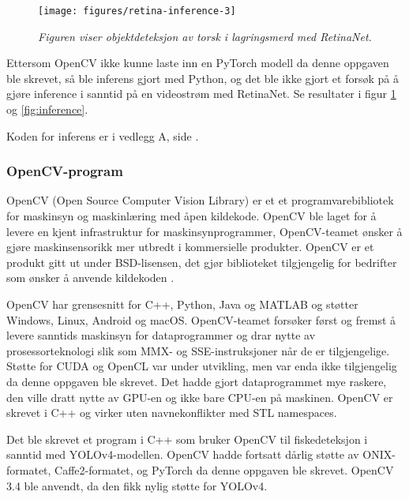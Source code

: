 \begin{figure}
\begin{center} 
\texttt{[image: figures/retina-inference-3]}
\caption{\small \sl Figuren viser objektdeteksjon av torsk i lagringsmerd med RetinaNet. \label{fig:retinenet_inference}} 
\end{center} 
\end{figure} 

Ettersom OpenCV ikke kunne laste inn en PyTorch modell da denne oppgaven ble skrevet, så ble inferens gjort med Python, og det ble ikke gjort et forsøk på å gjøre inference i sanntid på en videostrøm med RetinaNet. Se resultater i figur \ref{fig:retinenet_inference} og \ref{fig:inference}.

Koden for inferens er i vedlegg A, side \pageref{lst:inferens_retinanet}.

\subsubsection{OpenCV-program} \label{part:opencv}

OpenCV (Open Source Computer Vision Library) er et et programvarebibliotek for maskinsyn og maskinlæring med åpen kildekode. OpenCV ble laget for å levere en kjent infrastruktur for maskinsynprogrammer, OpenCV-teamet ønsker å gjøre maskinsensorikk mer utbredt i kommersielle produkter. OpenCV er et produkt gitt ut under BSD-lisensen, det gjør biblioteket tilgjengelig for bedrifter som ønsker å anvende kildekoden \cite{OpenCV Team 2020}.

OpenCV har grensesnitt for C++, Python, Java og MATLAB og støtter Windows, Linux, Android og macOS. OpenCV-teamet forsøker først og fremst å levere sanntids maskinsyn for dataprogrammer og drar nytte av prosessorteknologi slik som MMX- og SSE-instruksjoner når de er tilgjengelige. Støtte for CUDA og OpenCL var under utvikling, men var enda ikke tilgjengelig da denne oppgaven ble skrevet. Det hadde gjort dataprogrammet mye raskere, den ville dratt nytte av GPU-en og ikke bare CPU-en på maskinen. OpenCV er skrevet i C++ og virker uten navnekonflikter med STL namespaces. \cite{OpenCV Team 2020}

Det ble skrevet et program i C++ som bruker OpenCV til fiskedeteksjon i sanntid med YOLOv4-modellen. OpenCV hadde fortsatt dårlig støtte av ONIX-formatet, Caffe2-formatet, og PyTorch da denne oppgaven ble skrevet. OpenCV 3.4 ble anvendt, da den fikk nylig støtte for YOLOv4. \cite{Batanina 2020}

